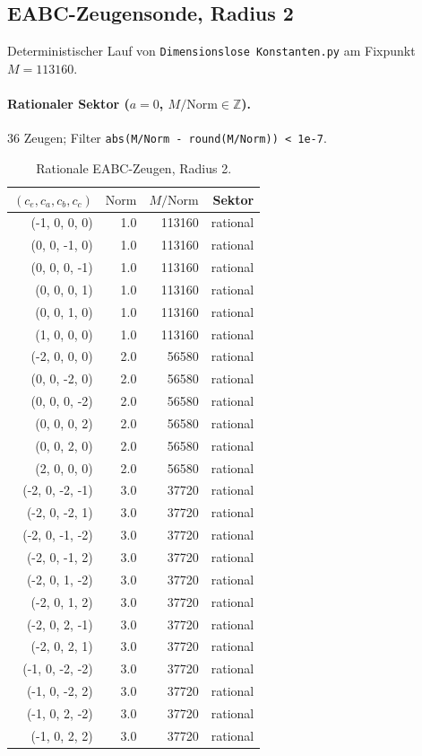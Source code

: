 \subsection{EABC-Zeugensonde, Radius 2}\label{sec:eabc-zeugen-r2}

Deterministischer Lauf von \texttt{Dimensionslose Konstanten.py} am Fixpunkt $M=113160$.

\paragraph{Rationaler Sektor ($a=0$, $M/\mathrm{Norm}\in\mathbb{Z}$).}
36 Zeugen; Filter \texttt{abs(M/Norm - round(M/Norm)) < 1e-7}.

\begin{table}[ht]
  \centering
  \caption{Rationale EABC-Zeugen, Radius 2.}
  \label{tab:eabc-rational-r2}
  \begin{tabular}{rrrr}
    \toprule
    $(c_e,c_a,c_b,c_c)$ & $\mathrm{Norm}$ & $M/\mathrm{Norm}$ & Sektor \\
    \midrule
    (-1, 0, 0, 0) & 1.0 & 113160 & rational \\
    (0, 0, -1, 0) & 1.0 & 113160 & rational \\
    (0, 0, 0, -1) & 1.0 & 113160 & rational \\
    (0, 0, 0, 1) & 1.0 & 113160 & rational \\
    (0, 0, 1, 0) & 1.0 & 113160 & rational \\
    (1, 0, 0, 0) & 1.0 & 113160 & rational \\
    (-2, 0, 0, 0) & 2.0 & 56580 & rational \\
    (0, 0, -2, 0) & 2.0 & 56580 & rational \\
    (0, 0, 0, -2) & 2.0 & 56580 & rational \\
    (0, 0, 0, 2) & 2.0 & 56580 & rational \\
    (0, 0, 2, 0) & 2.0 & 56580 & rational \\
    (2, 0, 0, 0) & 2.0 & 56580 & rational \\
    (-2, 0, -2, -1) & 3.0 & 37720 & rational \\
    (-2, 0, -2, 1) & 3.0 & 37720 & rational \\
    (-2, 0, -1, -2) & 3.0 & 37720 & rational \\
    (-2, 0, -1, 2) & 3.0 & 37720 & rational \\
    (-2, 0, 1, -2) & 3.0 & 37720 & rational \\
    (-2, 0, 1, 2) & 3.0 & 37720 & rational \\
    (-2, 0, 2, -1) & 3.0 & 37720 & rational \\
    (-2, 0, 2, 1) & 3.0 & 37720 & rational \\
    (-1, 0, -2, -2) & 3.0 & 37720 & rational \\
    (-1, 0, -2, 2) & 3.0 & 37720 & rational \\
    (-1, 0, 2, -2) & 3.0 & 37720 & rational \\
    (-1, 0, 2, 2) & 3.0 & 37720 & rational \\
    \bottomrule
  \end{tabular}
\end{table}

